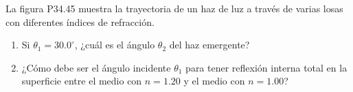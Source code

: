 \item La figura P34.45 muestra la trayectoria de un haz de luz a través de varias losas con diferentes índices de refracción.
\begin{enumerate}
    \item Si $\theta_1 = 30.0^\circ$, ¿cuál es el ángulo $\theta_2$ del haz emergente?
    \item ¿Cómo debe ser el ángulo incidente $\theta_1$ para tener reflexión interna total en la superficie entre el medio con $n = 1.20$ y el medio con $n = 1.00$?
\end{enumerate}